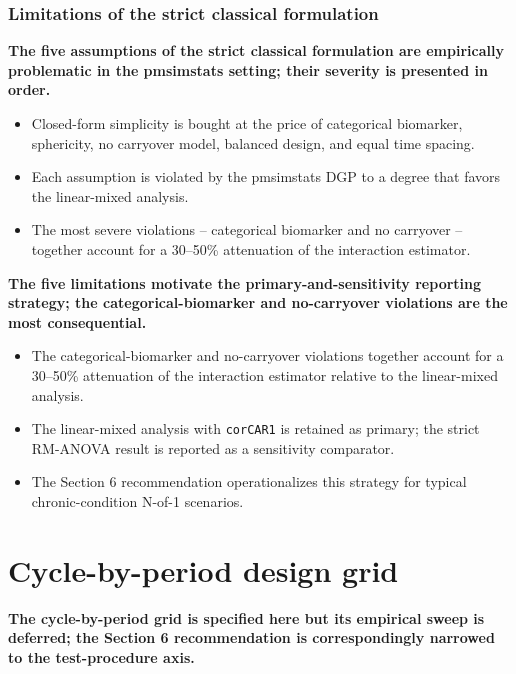 \documentclass[
  11pt,
]{article}
\begin{document}
\subsubsection{Limitations of the strict classical formulation}\label{limitations-of-the-strict-classical-formulation}

\textbf{The five assumptions of the strict classical formulation are empirically problematic in the pmsimstats setting; their severity is presented in order.}

\begin{itemize}\setlength{\itemsep}{2pt}\setlength{\parskip}{0pt}
\item Closed-form simplicity is bought at the price of categorical biomarker, sphericity, no carryover model, balanced design, and equal time spacing.
\item Each assumption is violated by the pmsimstats DGP to a degree that favors the linear-mixed analysis.
\item The most severe violations -- categorical biomarker and no carryover -- together account for a 30--50\% attenuation of the interaction estimator.
\end{itemize}

\textbf{The five limitations motivate the primary-and-sensitivity reporting strategy; the categorical-biomarker and no-carryover violations are the most consequential.}

\begin{itemize}\setlength{\itemsep}{2pt}\setlength{\parskip}{0pt}
\item The categorical-biomarker and no-carryover violations together account for a 30--50\% attenuation of the interaction estimator relative to the linear-mixed analysis.
\item The linear-mixed analysis with \texttt{corCAR1} is retained as primary; the strict RM-ANOVA result is reported as a sensitivity comparator.
\item The Section 6 recommendation operationalizes this strategy for typical chronic-condition N-of-1 scenarios.
\end{itemize}

\section{Cycle-by-period design grid}\label{cycle-by-period-design-grid}

\textbf{The cycle-by-period grid is specified here but its empirical sweep is deferred; the Section 6 recommendation is correspondingly narrowed to the test-procedure axis.}
\end{document}
